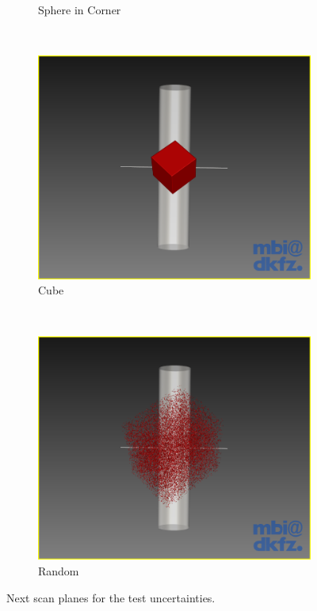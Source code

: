 \begin{figure}[H]
\begin{subfigure}[b]{0.5\textwidth}
    \caption{Sphere in Corner}
    \label{fig:nextscanplanespherecorner}
  \end{subfigure}
  ~%
  \begin{subfigure}[b]{0.5\textwidth}
    \includegraphics[width=\textwidth]{images/next_scan_plane/cube.png}
    \caption{Cube}
    \label{fig:nextscanplanecube}  
  \end{subfigure}%
  ~ %
  \begin{subfigure}[b]{0.5\textwidth}
    \includegraphics[width=\textwidth]{images/next_scan_plane/random.png}
    \caption{Random}
    \label{fig:nextscanplanerandom}  
  \end{subfigure}  
  \caption{Next scan planes for the test uncertainties.}\label{fig:nextscanplanetests}
\end{figure}

